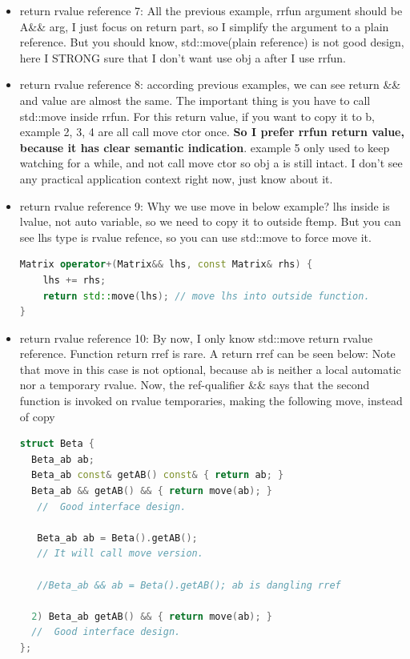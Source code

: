 \documentclass[a4paper,12pt,twoside]{book}
\begin{document}
\begin{itemize}
\item return rvalue reference 7: All the previous example, rrfun argument should be A\&\& arg,  I just focus on return part, so I simplify the argument to a plain reference. But you should know, std::move(plain reference) is not good design, here I STRONG sure that I don't want use obj a after I use rrfun.

\item return rvalue reference 8: according previous examples, we can see return \&\& and value are almost the same. The important thing is you have to call std::move inside rrfun.  For this return value, if you want to copy it to b,  example 2, 3, 4 are all call move ctor once. \textbf{So I prefer rrfun return value, because it has clear semantic indication}. example 5 only used to keep watching for a while, and not call move ctor so obj a is still intact. I don't see any practical application context right now, just know about it.

\item return rvalue reference 9: Why we use move in below example? lhs inside is lvalue, not auto variable,  so we need to copy it to outside ftemp. But you can see lhs type is rvalue refence, so you can use std::move to force move it.
\begin{lstlisting}[frame=single, language=c++]
Matrix operator+(Matrix&& lhs, const Matrix& rhs) {
    lhs += rhs;
    return std::move(lhs); // move lhs into outside function.
}
\end{lstlisting}

\item return rvalue reference 10:   By now, I only know std::move return rvalue reference.  Function return rref is rare. A return rref can be seen below:  Note that move in this case is not optional, because ab is neither a local automatic nor a temporary rvalue. Now, the ref-qualifier \&\& says that the second function is invoked on rvalue temporaries, making the following move, instead of copy
\begin{lstlisting}[frame=single, language=c++]
struct Beta {
  Beta_ab ab;
  Beta_ab const& getAB() const& { return ab; }
  Beta_ab && getAB() && { return move(ab); }
   //  Good interface design.

   Beta_ab ab = Beta().getAB();
   // It will call move version.

   //Beta_ab && ab = Beta().getAB(); ab is dangling rref

  2) Beta_ab getAB() && { return move(ab); }
  //  Good interface design.
};
\end{lstlisting}


\end{itemize}
\end{document}
